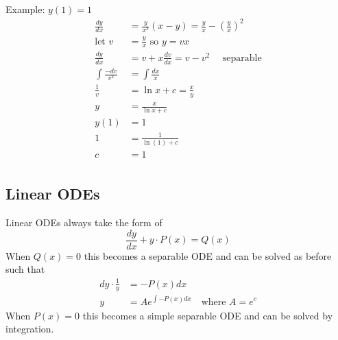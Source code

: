 \documentclass{article}
\begin{document}
Example: $y(1) = 1$
\begin{align*}
    \frac{dy}{dx} &= \frac{y}{x^2}(x-y) = \frac{y}{x} - \left(\frac{y}{x}\right)^2\\
    \textrm{let }v &= \frac{y}{x} \textrm{ so } y = vx\\
    \frac{dy}{dx} &= v + x\frac{dv}{dx} = v - v^2 \quad\textrm{ separable}\\
    \int \frac{-dv}{v^2} &= \int \frac{dx}{x}\\
    \frac{1}{v} &= \ln x + c = \frac{x}{y}\\
    y &= \frac{x}{\ln x + c}\\
    y(1) &= 1\\
    1 &= \frac{1}{\ln(1) + c}\\
    c &= 1\\
\end{align*}
\newpage
\subsection{Linear ODEs}
Linear ODEs always take the form of $$\frac{dy}{dx} + y\cdot P(x) = Q(x)$$
When $Q(x) = 0$ this becomes a separable ODE and can be solved as before such that
\begin{align*}
    dy \cdot \frac{1}{y} &= -P(x) dx\\
    y &= Ae^{\int -P(x)dx}\quad\textrm{where } A = e^c
\end{align*}
When $P(x) = 0$ this becomes a simple separable ODE and can be solved by integration.
\end{document}

